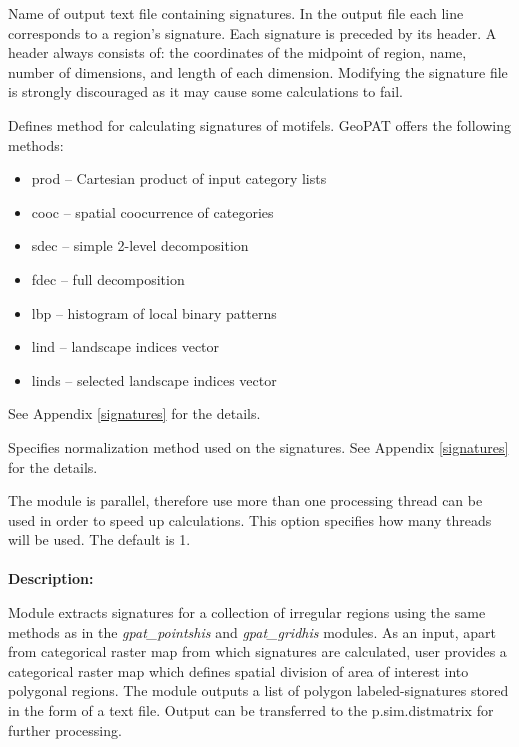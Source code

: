 
Name of output text file containing signatures. 
In the output file each line corresponds to a region's signature.
Each signature is preceded by its header. 
A header always consists of: the coordinates of the midpoint of region, name, number of dimensions, and length of each dimension. 
Modifying the signature file is strongly discouraged as it may cause some calculations to fail.


Defines method for calculating signatures of motifels. 
GeoPAT offers the following methods: 
\begin{itemize}
	\item prod -- Cartesian product of input category lists
	\item cooc -- spatial coocurrence of categories
	\item sdec -- simple 2-level decomposition
	\item fdec -- full decomposition
	\item lbp -- histogram of local binary patterns
	\item lind -- landscape indices vector
	\item linds -- selected landscape indices vector
\end{itemize}
See Appendix \ref{signatures} for the details.


Specifies normalization method used on the signatures. 
See Appendix \ref{signatures} for the details.


The module is parallel, therefore use more than one processing thread can be used in order to speed up calculations. 
This option specifies how many threads will be used. 
The default is 1.
\\\\
{\bf Description:}

Module extracts signatures for a collection of irregular regions using the same methods as in the {\it gpat\_pointshis} and {\it gpat\_gridhis} modules. 
As an input, apart from categorical raster map from which signatures are calculated, user provides a categorical raster map which defines spatial division of area of interest into polygonal regions. 
The module outputs a list of polygon labeled-signatures stored in the form of a text file. 
Output can be transferred to the p.sim.distmatrix for further processing.

